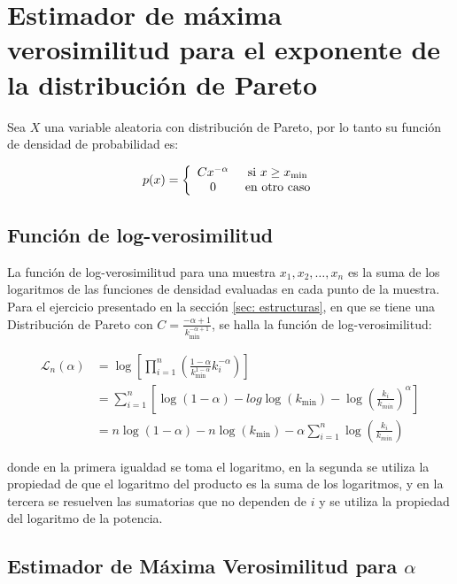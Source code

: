 \documentclass{article}
\begin{document}
\section{Estimador de máxima verosimilitud para el exponente de la distribución de Pareto} \label{sec: pareto}

Sea $X$ una variable aleatoria con distribución de Pareto, por lo tanto su función de densidad de probabilidad es:

$$p(x) = \left\lbrace \begin{array}{c c} C x^{-\alpha} & \text{ si } x\geq x_\text{min} \\ 0 & \text{ en otro caso} \end{array}\right.$$

\subsection{Función de log-verosimilitud}

La función de log-verosimilitud para una muestra $x_1, x_2, \ldots, x_n$ es la suma de los logaritmos de las funciones de densidad evaluadas en cada punto de la muestra. Para el ejercicio presentado en la sección \ref{sec: estructuras}, en que se tiene una Distribución de Pareto con $C = \frac{-\alpha+1}{k_{\text{min}}^{-\alpha+1}}$, se halla la función de log-verosimilitud:

\begin{align}
    \mathcal{L}_n(\alpha) & = \log \left[\prod_{i=1}^{n} \left( \frac{1-\alpha}{k_{\text{min}}^{1-\alpha}} k_i^{-\alpha} \right) \right] \nonumber               \\
                          & = \sum_{i=1}^{n} \left[ \log(1-\alpha) - log\log(k_{\text{min}}) - \log \left(\frac{k_i}{k_{min}} \right)^{\alpha} \right] \nonumber \\
                          & = n \log(1-\alpha) - n\log(k_{\text{min}}) - \alpha \sum_{i=1}^{n} \log\left(\frac{k_i}{k_{min}} \right)
\end{align}

donde en la primera igualdad se toma el logaritmo, en la segunda se utiliza la propiedad de que el logaritmo del producto es la suma de los logaritmos, y en la tercera se resuelven las sumatorias que no dependen de $i$ y se utiliza la propiedad del logaritmo de la potencia.

\subsection{Estimador de Máxima Verosimilitud para $\alpha$}
\end{document}
